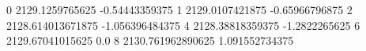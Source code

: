 0 2129.1259765625 -0.54443359375
1 2129.0107421875 -0.65966796875
2 2128.614013671875 -1.056396484375
4 2128.38818359375 -1.2822265625
6 2129.67041015625 0.0
8 2130.761962890625 1.091552734375
